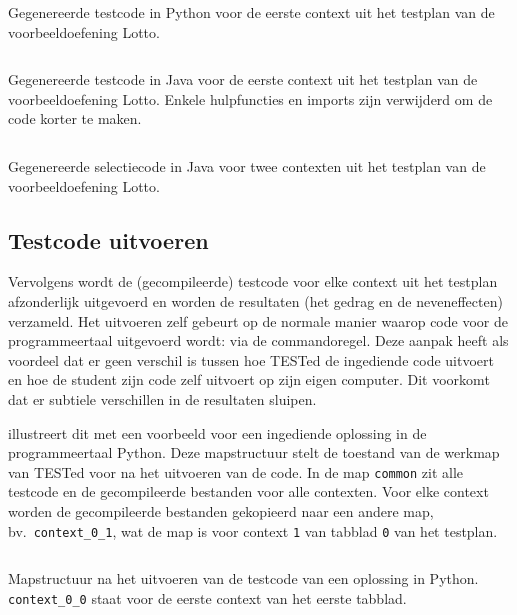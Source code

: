 \begin{listing}
    \inputminted{python}{code/generated-context-1.py}
    \caption{
        Gegenereerde testcode in Python voor de eerste context uit het testplan van de voorbeeldoefening Lotto.
    }
    \label{lst:generated-context-python}
\end{listing}

\begin{listing}
    \inputminted{java}{code/generated-context-1.java}
    \caption{
        Gegenereerde testcode in Java voor de eerste context uit het testplan van de voorbeeldoefening Lotto.
        Enkele hulpfuncties en imports zijn verwijderd om de code korter te maken.
    }
    \label{lst:generated-context-java}
\end{listing}

\begin{listing}
    \inputminted{java}{code/Selector.java}
    \caption{
        Gegenereerde selectiecode in Java voor twee contexten uit het testplan van de voorbeeldoefening Lotto.
    }
    \label{lst:selector-java}
\end{listing}

\subsection{Testcode uitvoeren}\label{subsec:testcode-uitvoeren}

Vervolgens wordt de (gecompileerde) testcode voor elke context uit het testplan afzonderlijk uitgevoerd en worden de resultaten (het gedrag en de neveneffecten) verzameld.
Het uitvoeren zelf gebeurt op de normale manier waarop code voor de programmeertaal uitgevoerd wordt: via de commandoregel.
Deze aanpak heeft als voordeel dat er geen verschil is tussen hoe TESTed de ingediende code uitvoert en hoe de student zijn code zelf uitvoert op zijn eigen computer.
Dit voorkomt dat er subtiele verschillen in de resultaten sluipen.

 illustreert dit met een voorbeeld voor een ingediende oplossing in de programmeertaal Python.
Deze mapstructuur stelt de toestand van de werkmap van TESTed voor na het uitvoeren van de code.
In de map \texttt{common} zit alle testcode en de gecompileerde bestanden voor alle contexten.
Voor elke context worden de gecompileerde bestanden gekopieerd naar een andere map, bv.\ \texttt{context\_0\_1}, wat de map is voor context \texttt{1} van tabblad \texttt{0} van het testplan.

\begin{listing}
    \inputminted{text}{code/dir-listing.txt}
    \caption{Mapstructuur na het uitvoeren van de testcode van een oplossing in Python.
    \texttt{context\_0\_0} staat voor de eerste context van het eerste tabblad.
    }
    \label{lst:mapstructuur}
\end{listing}

